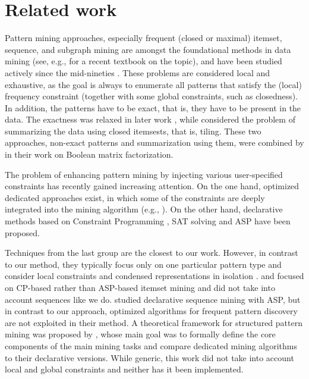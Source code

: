 
\section{Related work}\label{sec:relwork}

Pattern mining approaches, especially frequent (closed or maximal) itemset, sequence, and subgraph mining are amongst the foundational methods in data mining (see, e.g., \textcite{aggarwal15data} for a recent textbook on the topic), and have been studied actively since the mid-nineties \parencite{agrawal93mining,DBLP:books/mit/fayyadPSU96/AgrawalMSTV96}. These problems are considered local and exhaustive, as the goal is always to enumerate all patterns that satisfy the (local) frequency constraint (together with some global constraints, such as closedness). In addition, the patterns have to be exact, that is, they have to be present in the data. The exactness was relaxed in later work \parencite{pensa05towards}, while \textcite{tiling} considered the problem of summarizing the data using closed itemsests, that is, tiling. These two approaches, non-exact patterns and summarization using them, were combined by \textcite{dbp} in their work on Boolean matrix factorization. 

The problem of enhancing pattern mining by injecting various user-specified constraints has recently gained increasing attention. On the one hand, optimized dedicated approaches exist, in which some of the constraints are deeply integrated into the mining algorithm (e.g., \textcite{DBLP:conf/kdd/PeiH00}).  On the other hand, %
declarative methods based on Constraint Programming \parencite{sky2014,DBLP:conf/cpaior/NegrevergneG15,DBLP:journals/corr/MetivierLC13}, SAT solving \parencite{DBLP:conf/pakdd/JabbourSS15,DBLP:conf/cikm/JabbourSS13} and ASP \parencite{DBLP:conf/lpnmr/Jarvisalo11,DBLP:conf/ijcai/GebserGQ0S16,DBLP:journals/corr/GuyetMQ14} have been proposed. 

Techniques from the last group are the closest to our work. However, in contrast to our method, they typically focus only on one particular pattern type and consider local constraints and condensed representations in isolation \parencite{DBLP:conf/dmkd/PeiHM00,clospan}. %
\textcite{dp2013} and \textcite{DBLP:journals/ai/GunsDNTR17} focused on CP-based rather than ASP-based itemset mining and did not take into account sequences like we do. \textcite{DBLP:conf/ijcai/GebserGQ0S16} studied declarative sequence mining with ASP, but in contrast to our approach, optimized algorithms for frequent pattern discovery are not exploited in their method.
A theoretical framework for structured pattern mining was proposed by \textcite{DBLP:conf/aaai/GunsPN16}, whose main goal was to formally define the core components of the main mining tasks and compare dedicated mining algorithms to their declarative versions. While generic, this work did not take into account local and global constraints and neither has it been implemented.

